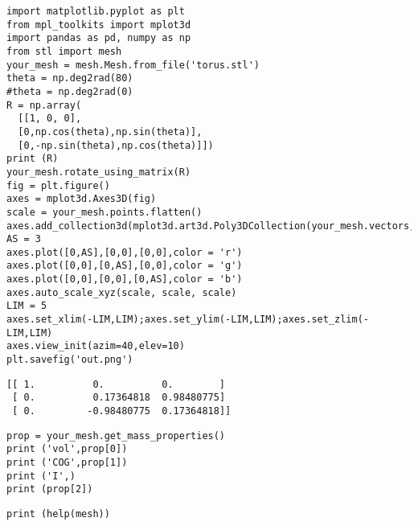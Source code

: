 \documentclass[12pt,fleqn]{article}\usepackage{../../common}
\begin{document}
\begin{verbatim}
import matplotlib.pyplot as plt
from mpl_toolkits import mplot3d
import pandas as pd, numpy as np
from stl import mesh
your_mesh = mesh.Mesh.from_file('torus.stl')
theta = np.deg2rad(80)
#theta = np.deg2rad(0)
R = np.array(
  [[1, 0, 0],
  [0,np.cos(theta),np.sin(theta)],
  [0,-np.sin(theta),np.cos(theta)]])
print (R)
your_mesh.rotate_using_matrix(R)
fig = plt.figure()
axes = mplot3d.Axes3D(fig)
scale = your_mesh.points.flatten()
axes.add_collection3d(mplot3d.art3d.Poly3DCollection(your_mesh.vectors,alpha=0.3))
AS = 3
axes.plot([0,AS],[0,0],[0,0],color = 'r')
axes.plot([0,0],[0,AS],[0,0],color = 'g')
axes.plot([0,0],[0,0],[0,AS],color = 'b')
axes.auto_scale_xyz(scale, scale, scale)
LIM = 5
axes.set_xlim(-LIM,LIM);axes.set_ylim(-LIM,LIM);axes.set_zlim(-LIM,LIM)
axes.view_init(azim=40,elev=10)
plt.savefig('out.png')
\end{verbatim}

\begin{verbatim}
[[ 1.          0.          0.        ]
 [ 0.          0.17364818  0.98480775]
 [ 0.         -0.98480775  0.17364818]]
\end{verbatim}


\begin{verbatim}
prop = your_mesh.get_mass_properties()
print ('vol',prop[0])
print ('COG',prop[1])
print ('I',)
print (prop[2])
\end{verbatim}












\begin{verbatim}
print (help(mesh))
\end{verbatim}
\end{document}
